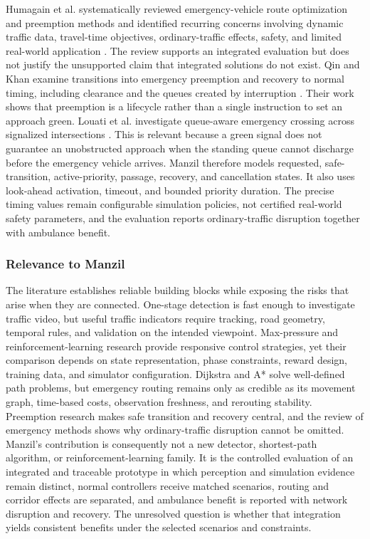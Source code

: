 Humagain et al. systematically reviewed emergency-vehicle route optimization and preemption methods and identified recurring concerns involving dynamic traffic data, travel-time objectives, ordinary-traffic effects, safety, and limited real-world application \cite{humagain2020review}. The review supports an integrated evaluation but does not justify the unsupported claim that integrated solutions do not exist. Qin and Khan examine transitions into emergency preemption and recovery to normal timing, including clearance and the queues created by interruption \cite{qin2012preemption}. Their work shows that preemption is a lifecycle rather than a single instruction to set an approach green. Louati et al. investigate queue-aware emergency crossing across signalized intersections \cite{el2018emergency}. This is relevant because a green signal does not guarantee an unobstructed approach when the standing queue cannot discharge before the emergency vehicle arrives. Manzil therefore models requested, safe-transition, active-priority, passage, recovery, and cancellation states. It also uses look-ahead activation, timeout, and bounded priority duration. The precise timing values remain configurable simulation policies, not certified real-world safety parameters, and the evaluation reports ordinary-traffic disruption together with ambulance benefit.

\subsubsection{Relevance to Manzil}

The literature establishes reliable building blocks while exposing the risks that arise when they are connected. One-stage detection is fast enough to investigate traffic video, but useful traffic indicators require tracking, road geometry, temporal rules, and validation on the intended viewpoint. Max-pressure and reinforcement-learning research provide responsive control strategies, yet their comparison depends on state representation, phase constraints, reward design, training data, and simulator configuration. Dijkstra and A* solve well-defined path problems, but emergency routing remains only as credible as its movement graph, time-based costs, observation freshness, and rerouting stability. Preemption research makes safe transition and recovery central, and the review of emergency methods shows why ordinary-traffic disruption cannot be omitted. Manzil's contribution is consequently not a new detector, shortest-path algorithm, or reinforcement-learning family. It is the controlled evaluation of an integrated and traceable prototype in which perception and simulation evidence remain distinct, normal controllers receive matched scenarios, routing and corridor effects are separated, and ambulance benefit is reported with network disruption and recovery. The unresolved question is whether that integration yields consistent benefits under the selected scenarios and constraints.


